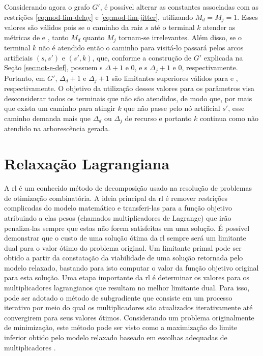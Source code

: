Considerando  agora o  grafo $G'$,  é possível  alterar as  constantes
associadas    com    as    restrições    \eqref{eq:mod-lim-delay}    e
\eqref{eq:mod-lim-jitter}, utilizando $M_d =  M_j = 1$.  Esses valores
são válidos pois se  o caminho da raiz $s$ até  o terminal $k$ atender
as  métricas  de  {\delay}  e  {\jitter},  tanto  $M_d$  quanto  $M_j$
tornam-se irrelevantes. Além  disso, se o terminal $k$  não é atendido
então o  caminho para visitá-lo  passará pelos arcos  artificiais $(s,
s')$ e  $(s', k)$,  que, conforme  a construção  de $G'$  explicada na
Seção \ref{sec:not-e-def},  possuem {\delay s}  $\Delta + 1$ e  $0$, e
{\jitter s} $\Delta_j + 1$  e $0$, respectivamente. Portanto, em $G'$,
$\Delta_d + 1$ e $\Delta_j + 1$ são limitantes superiores válidos para
{\delay}  e  {\jitter},  respectivamente.  O  objetivo  da  utilização
desses  valores  para  os   parâmetros  visa  desconsiderar  todos  os
terminais que não  são atendidos, de modo que, por  mais que exista um
caminho para atingir  $k$ que não passe pelo nó  artificial $s'$, esse
caminho  demanda  mais  que  $\Delta_d$ ou  $\Delta_j$  de  recurso  e
portanto $k$ continua como não atendido na arborescência gerada.

\section{Relaxação Lagrangiana} \label{sec:rel-lagrangiana}

A \gls{rl} é um conhecido método de decomposição usado na resolução de problemas
de otimização combinatória.  A ideia principal da \gls{rl}  é remover restrições
complicadas  do  modelo  matemático  e  transferi-las  para  a  função  objetivo
atribuindo  a  elas  pesos  (chamados  multiplicadores  de  Lagrange)  que  irão
penaliza-las sempre que  estas não forem satisfeitas em uma  solução. É possível
demonstrar que o custo de uma solução ótima da \gls{rl} sempre será um limitante
dual  para o  valor ótimo  do problema  original. Um  limitante primal  pode ser
obtido a  partir da  constatação da  viabilidade de  uma solução  retornada pelo
modelo relaxado, bastando para isto computar o valor da função objetivo original
para esta solução. Uma etapa importante da \gls{rl} é determinar os valores para
os  multiplicadores lagrangianos  que resultam  no melhor  limitante dual.  Para
isso, pode  ser adotado  o método  de subgradiente que  consiste em  um processo
iterativo por meio do qual os multiplicadores são atualizados iterativamente até
convergirem para seus valores ótimos.  Considerando um problema originalmente de
minimização, este  método pode ser visto  como a maximização do  limite inferior
obtido pelo  modelo relaxado  baseado em  escolhas adequadas  de multiplicadores
\cite{Beasley:1993}.

